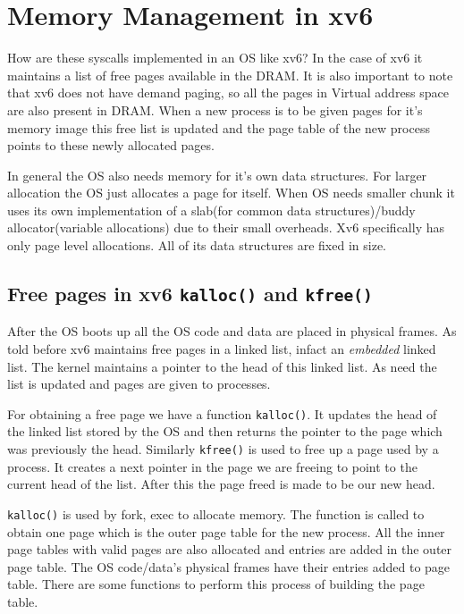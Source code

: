 \documentclass[12pt]{article}
\newcommand{\tbox}[1]{\noindent\fbox{\parbox{\textwidth}{#1}}}
\begin{document}
\newpage
\noindent\tbox{
    \begin{center}
    \textbf{\Huge Lecture 20}
    \end{center}
}
\section{Memory Management in xv6}
How are these syscalls implemented in an OS like xv6? In the case of xv6 it maintains a list of free pages available in the DRAM.
It is also important to note that xv6 does not have demand paging, so all the pages in Virtual address space are also present in DRAM. When a new process is to be given pages for it's memory image this 
free list is updated and the page table of the new process points to these newly allocated pages.

In general the OS also needs memory for it's own data structures. For larger allocation the OS just allocates a page for itself. When OS needs smaller chunk it uses its own implementation of a slab(for common data structures)/buddy allocator(variable allocations) due to their small overheads.
Xv6 specifically has only page level allocations. All of its data structures are fixed in size.
\subsection{Free pages in xv6 \texttt{kalloc()} and \texttt{kfree()}}
After the OS boots up all the OS code and data are placed in physical frames. As told before xv6 maintains free
pages in a linked list, infact an \textit{embedded} linked list. The kernel maintains a pointer to the head of this linked list. As need the list is updated and 
pages are given to processes.

For obtaining a free page we have a function \texttt{kalloc()}. It updates the head of the linked list stored by the OS and then returns the pointer
to the page which was previously the head. Similarly \texttt{kfree()} is used to free up a page used by a process. It creates a next pointer in the page we are freeing to point to the current head of the list. After this the 
page freed is made to be our new head.

\texttt{kalloc()} is used by fork, exec to allocate memory. The function is called to obtain one page which is the outer page table for the new process. All the inner page tables with valid pages are also allocated and entries
are added in the outer page table. The OS code/data's physical frames have their entries added to page table. There are some functions to perform this process of building the page table.
\end{document}
